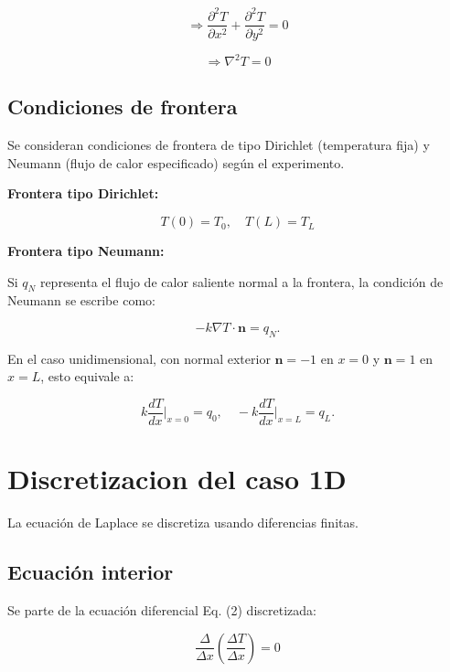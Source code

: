 \documentclass[11pt,a4paper]{article}
\begin{document}
\begin{equation}
\Rightarrow \frac{\partial^2T}{\partial x^2}+\frac{\partial^2T}{\partial y^2}=0
\end{equation}

\begin{equation}
\Rightarrow \nabla^2 T = 0
\end{equation}

\subsection{Condiciones de frontera}

Se consideran condiciones de frontera de tipo Dirichlet (temperatura fija) y 
Neumann (flujo de calor especificado) seg\'un el experimento.

\textbf{Frontera tipo Dirichlet:}

\begin{equation}
T(0)=T_0, \quad T(L)=T_L
\end{equation}

\textbf{Frontera tipo Neumann:}

Si $q_N$ representa el flujo de calor saliente normal a la frontera, la
condici\'on de Neumann se escribe como:

\begin{equation}
-k\nabla T \cdot \mathbf{n} = q_N.
\end{equation}

En el caso unidimensional, con normal exterior $\mathbf{n}=-1$ en $x=0$ y
$\mathbf{n}=1$ en $x=L$, esto equivale a:

\begin{equation}
k\frac{dT}{dx}\bigg|_{x=0} = q_0, \quad
-k\frac{dT}{dx}\bigg|_{x=L} = q_L.
\end{equation}

\section{Discretizacion del caso 1D}

La ecuaci\'on de Laplace se discretiza usando diferencias finitas.

\subsection{Ecuaci\'on interior}

Se parte de la ecuaci\'on diferencial Eq. (2) discretizada:

\begin{equation}
\frac{\Delta}{\Delta x} \left( \frac{\Delta T}{\Delta x} \right) = 0
\end{equation}
\end{document}
